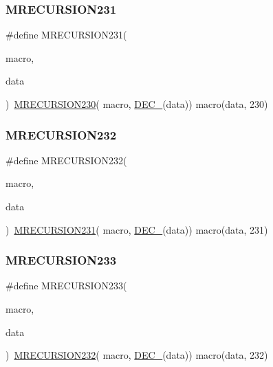 \subsubsection{\texorpdfstring{MRECURSION231}{MRECURSION231}}
{\footnotesize\ttfamily \#define M\+R\+E\+C\+U\+R\+S\+I\+O\+N231(\begin{DoxyParamCaption}\item[{}]{macro,  }\item[{}]{data }\end{DoxyParamCaption})~\mbox{\hyperlink{group__group__sam0__utils__mrecursion_ga4eeac3211fea63e6fe6eb6b32b6fbc89}{M\+R\+E\+C\+U\+R\+S\+I\+O\+N230}}(  macro, \mbox{\hyperlink{group__group__sam0__utils__mrecursion_ga1d23d683797679dca8c3512a54a5dcae}{D\+E\+C\+\_\+}}(data))   macro(data, 230)}

\mbox{\label{group__group__sam0__utils__mrecursion_ga6eaa22abc9c118aceaec7716bcaf7158}} 
\subsubsection{\texorpdfstring{MRECURSION232}{MRECURSION232}}
{\footnotesize\ttfamily \#define M\+R\+E\+C\+U\+R\+S\+I\+O\+N232(\begin{DoxyParamCaption}\item[{}]{macro,  }\item[{}]{data }\end{DoxyParamCaption})~\mbox{\hyperlink{group__group__sam0__utils__mrecursion_ga924bf3ce6728e48c4ef04ba0bc5f0707}{M\+R\+E\+C\+U\+R\+S\+I\+O\+N231}}(  macro, \mbox{\hyperlink{group__group__sam0__utils__mrecursion_ga1d23d683797679dca8c3512a54a5dcae}{D\+E\+C\+\_\+}}(data))   macro(data, 231)}

\mbox{\label{group__group__sam0__utils__mrecursion_ga81fce57cdf82d227ab4610a36a8614e4}} 
\subsubsection{\texorpdfstring{MRECURSION233}{MRECURSION233}}
{\footnotesize\ttfamily \#define M\+R\+E\+C\+U\+R\+S\+I\+O\+N233(\begin{DoxyParamCaption}\item[{}]{macro,  }\item[{}]{data }\end{DoxyParamCaption})~\mbox{\hyperlink{group__group__sam0__utils__mrecursion_ga6eaa22abc9c118aceaec7716bcaf7158}{M\+R\+E\+C\+U\+R\+S\+I\+O\+N232}}(  macro, \mbox{\hyperlink{group__group__sam0__utils__mrecursion_ga1d23d683797679dca8c3512a54a5dcae}{D\+E\+C\+\_\+}}(data))   macro(data, 232)}

